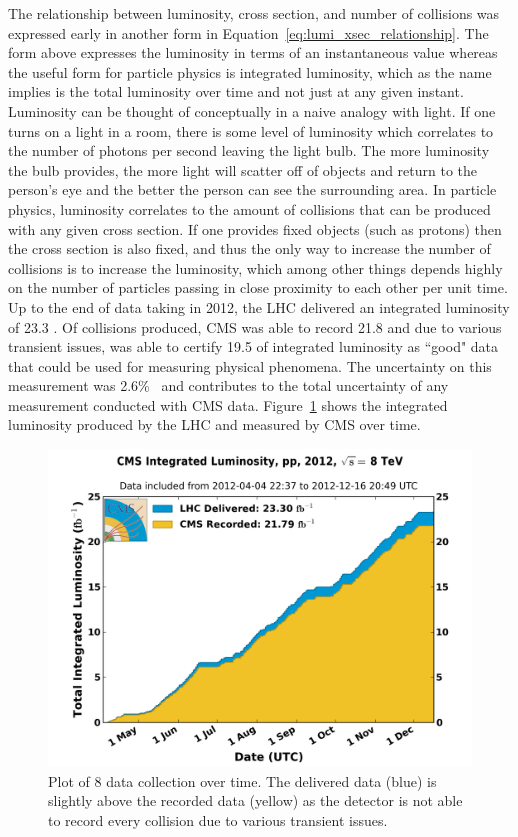 		The relationship between luminosity, cross section, and number of collisions was expressed early in another form in Equation~\ref{eq:lumi_xsec_relationship}. The form above expresses the luminosity in terms of an instantaneous value whereas the useful form for particle physics is integrated luminosity, which as the name implies is the total luminosity over time and not just at any given instant. Luminosity can be thought of conceptually in a naive analogy with light. If one turns on a light in a room, there is some level of luminosity which correlates to the number of photons per second leaving the light bulb. The more luminosity the bulb provides, the more light will scatter off of objects and return to the person's eye and the better the person can see the surrounding area. In particle physics, luminosity correlates to the amount of collisions that can be produced with any given cross section. If one provides fixed objects (such as protons) then the cross section is also fixed, and thus the only way to increase the number of collisions is to increase the luminosity, which among other things depends highly on the number of particles passing in close proximity to each other per unit time. \\
		
		Up to the end of data taking in 2012, the LHC delivered an integrated luminosity of 23.3 \fbinv. Of collisions produced, CMS was able to record 21.8 \fbinv and due to various transient issues, was able to certify 19.5 \fbinv of integrated luminosity as ``good" data that could be used for measuring physical phenomena. The uncertainty on this measurement was 2.6\%~\cite{lumi12up} and contributes to the total uncertainty of any measurement conducted with CMS data. Figure~\ref{fig:cms_int_lumi} shows the integrated luminosity produced by the LHC and measured by CMS over time.\\
\begin{figure}[h]
\begin{center}
\includegraphics[width=0.9\linewidth]{Figs/int_lumi_per_day_cumulative_pp_2012.png}
\caption{\label{fig:cms_int_lumi}
Plot of 8 \TeV data collection over time. The delivered data (blue) is slightly above the recorded data (yellow) as the detector is not able to record every collision due to various transient issues.
}
\end{center}
\end{figure}

